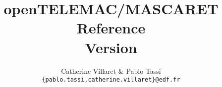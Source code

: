 \title{\textbf{openTELEMAC/MASCARET \\
\sisyphe Reference \\
Version \rel}}
\author{Catherine Villaret \& Pablo Tassi \\
   \texttt{\{pablo.tassi,catherine.villaret\}@edf.fr}}

\date{}
 
\maketitle
